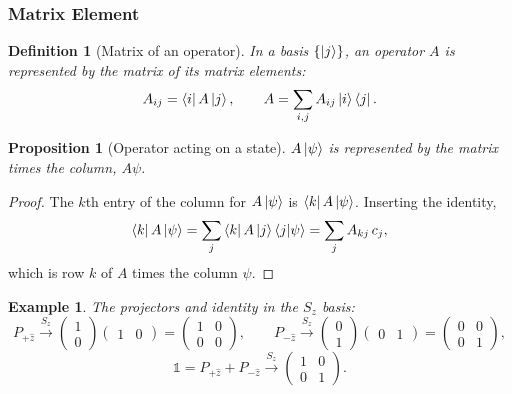 \documentclass{article}
\newtheorem{definition}{Definition}
\newtheorem*{example}{Example}
\newtheorem{proposition}{Proposition}
\newcommand{\id}{\mathds{1}}
\begin{document}
\subsubsection{Matrix Element}
\begin{definition}[Matrix of an operator]
    In a basis $\{\ket{j}\}$, an operator $A$ is represented by the matrix of its \emph{matrix elements}:
    \begin{equation}
        A_{ij} = \bra{i}A\ket{j}, \qquad A = \sum_{i,j}A_{ij}\ket{i}\bra{j}.
    \end{equation}
\end{definition}
\begin{proposition}[Operator acting on a state]
    $A\ket{\psi}$ is represented by the matrix times the column, $A\psi$.
\end{proposition}
\begin{proof}
    The $k$th entry of the column for $A\ket{\psi}$ is $\bra{k}A\ket{\psi}$. Inserting the identity,
    \[\bra{k}A\ket{\psi} = \sum_j\bra{k}A\ket{j}\braket{j|\psi} = \sum_j A_{kj}\,c_j,\]
    which is row $k$ of $A$ times the column $\psi$.
\end{proof}
\begin{example}
    The projectors and identity in the $S_z$ basis:
    \[P_{+\hat{z}} \xrightarrow{S_z} \begin{pmatrix} 1 \\ 0 \end{pmatrix}\begin{pmatrix} 1 & 0 \end{pmatrix} = \begin{pmatrix} 1 & 0 \\ 0 & 0 \end{pmatrix}, \qquad P_{-\hat{z}} \xrightarrow{S_z} \begin{pmatrix} 0 \\ 1 \end{pmatrix}\begin{pmatrix} 0 & 1 \end{pmatrix} = \begin{pmatrix} 0 & 0 \\ 0 & 1 \end{pmatrix},\]
    \[\id = P_{+\hat{z}} + P_{-\hat{z}} \xrightarrow{S_z} \begin{pmatrix} 1 & 0 \\ 0 & 1 \end{pmatrix}.\]
\end{example}
\end{document}
